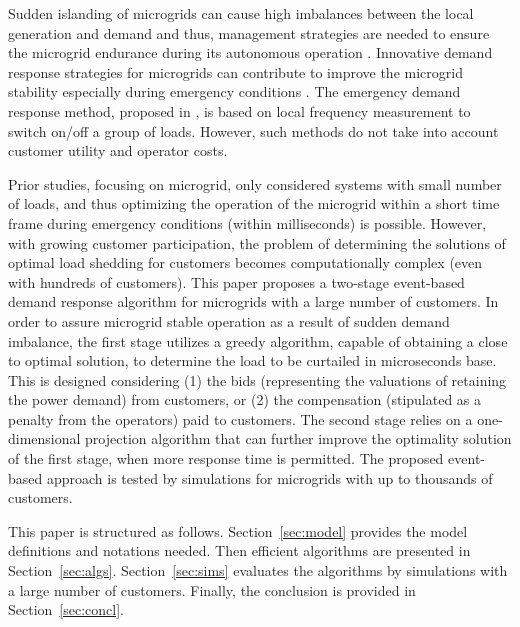 Sudden islanding of microgrids can cause high imbalances between the local generation and demand and thus, management strategies are needed to ensure the microgrid endurance during its autonomous operation \cite{Ref10}. Innovative demand response strategies for microgrids can contribute to improve the microgrid stability especially during emergency conditions \cite{Ref10}. The emergency demand response method, proposed in \cite{Ref10,Ref12}, is based on local frequency measurement to switch on/off a group of loads. However, such methods do not take into account customer utility and operator costs. 


Prior studies, focusing on microgrid, only considered systems with small number of loads, and thus optimizing the operation of the microgrid within a short time frame during emergency conditions (within milliseconds) is possible. However, with growing customer participation, the problem of determining the solutions of optimal load shedding for customers becomes computationally complex (even with hundreds of customers). This paper proposes a two-stage event-based demand response algorithm for microgrids with a large number of customers. In order to assure microgrid stable operation as a result of sudden demand imbalance, the first stage utilizes a greedy algorithm, capable of obtaining a close to optimal solution, to determine the load to be curtailed in microseconds base. This is designed considering (1) the bids (representing the valuations of retaining the power demand) from customers, or (2) the compensation (stipulated as a penalty from the operators) paid to customers. The second stage relies on a one-dimensional projection algorithm that can further improve the optimality solution of the first stage, when more response time is permitted. The proposed event-based approach is tested by simulations for microgrids with up to thousands of customers.



This paper is structured as follows.
Section~\ref{sec:model} provides the model definitions and notations needed. Then efficient algorithms are presented in Section~\ref{sec:algs}. Section~\ref{sec:sims} evaluates the algorithms by simulations with a large number of customers. Finally, the conclusion is provided in Section~\ref{sec:concl}.
